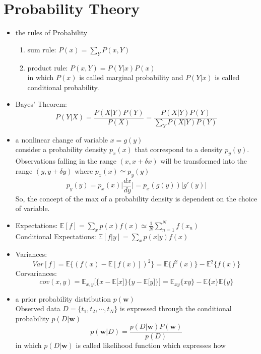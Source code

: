 \documentclass[UTF8]{article}
\begin{document}
    \section{Probability Theory}
    \begin{itemize}
        \item the rules of Probability
        \begin{enumerate}
            \item sum rule: $P(x)=\sum_YP(x,Y)$
            \item product rule: $P(x,Y)=P(Y|x)P(x)$\\
            in which $P(x)$ is called marginal probability and $P(Y|x)$ is 
            called conditional probability.
        \end{enumerate}
        \item Bayes' Theorem:
        \[
            P(Y|X)=\frac{P(X|Y)P(Y)}{P(X)}=\frac{P(X|Y)P(Y)}{\sum_Y{P(X|Y)P(Y)}}
            \]
        \item a nonlinear change of variable $x=g(y)$\\
        consider a probability density $p_x(x)$ that correspond to a density $p_y(y)$.
        Observations falling in the range $(x,x+\delta x)$ will be transformed into the
        range $(y, y+\delta y)$ where $p_x(x)\simeq p_y(y)$
        \[
            p_y(y)=p_x(x)\Big\vert\frac{dx}{dy}\Big\vert=p_x(g(y))\vert g'(y)\vert
            \]
        So, the concept of the max of a probability density is dependent on the choice
        of variable.
        \item Expectations: $\mathbb{E}[f]=\sum_xp(x)f(x)\simeq \frac{1}{N}\sum_{n=1}
        ^{N}f(x_n)$\\
        Conditional Expectations: $\mathbb{E}[f|y]=\sum_xp(x|y)f(x)$
        \item Variances: \[Var[f]=\mathbb{E}\{(f(x)-\mathbb{E}[f(x)])^2\}=
        \mathbb{E}\{f^2(x)\}-\mathbb{E}^2\{f(x)\}\]
        Corvariances: \[cov(x,y)=\mathbb{E}_{x,y}\lbrack\{x-\mathbb{E}\lbrack x\rbrack\}
        \{y-\mathbb{E}\lbrack y\rbrack\}\rbrack=\mathbb{E}_{xy}\lbrace xy\rbrace-
        \mathbb{E}\lbrace x\rbrace\mathbb{E}\lbrace y\rbrace\]
        \item a prior probability distribution $p(\bm{w})$\\
        Observed data $D=\{t_1,t_2,\cdots,t_N\}$ is expressed through the conditional
        probability $p(D|\bm{w})$
        \[
            p(\bm{w}|D)=\frac{p(D|\bm{w})P(\bm{w})}{p(D)}
            \]
        in which $p(D|\bm{w})$ is called likelihood function which expresses how 

\end{itemize}
\end{document}
